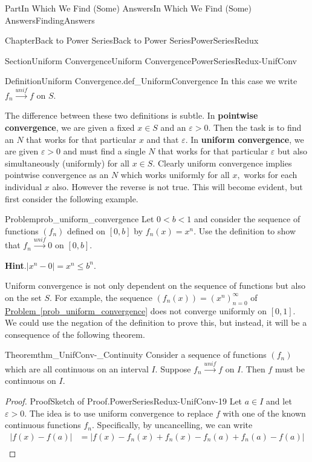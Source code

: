 \documentclass[oneside,10pt,]{book}
\newcommand{\blocktitlefont}{\relax}
\newcommand{\xreffont}{\relax}
\newcommand{\terminology}[1]{\textbf{#1}}
\numberwithin{equation}{part}
\newcommand{\eps}{\varepsilon}
\newcommand{\unif}{\stackrel{unif}{\longrightarrow}}
\newcommand{\lt}{<}
\newcommand{\amp}{&}
\begin{document}
\begin{partptx}{Part}{In Which We Find (Some) Answers}{}{In Which We Find (Some) Answers}{}{}{FindingAnswers}
\begin{chapterptx}{Chapter}{Back to Power Series}{}{Back to Power Series}{}{}{PowerSeriesRedux}
\begin{sectionptx}{Section}{Uniform Convergence}{}{Uniform Convergence}{}{}{PowerSeriesRedux-UnifConv}
\begin{definition}{Definition}{Uniform Convergence.}{def_UniformConvergence}
In this case we write \(f_n\unif f\) on \(S\).%
\end{definition}
The difference between these two definitions is subtle.  In \terminology{pointwise convergence}, we are given a fixed \(x\in S\) and an \(\eps>0\).  Then the task is to find an \(N\) that works for that particular \(x\) and that \(\eps\).  In \terminology{uniform convergence}, we are given \(\eps>0\) and must find a single \(N\) that works for that particular \(\eps\) but also simultaneously (uniformly) for all \(x\in S\).  Clearly uniform convergence implies pointwise convergence as an \(N\) which works uniformly for all \(x,\) works for each individual \(x\) also.  However the reverse is not true. This will become evident, but first consider the following example.%
\begin{problem}{Problem}{}{prob_uniform_convergence}%
Let \(0\lt b\lt 1\) and consider the sequence of functions \(\left(f_n\right)\) defined on \([0,b]\) by \(f_n(x)=x^n\).  Use the definition to show that \(f_n\unif 0\) on \([0,b]\).%
\par\smallskip%
\noindent\textbf{\blocktitlefont Hint}.\hypertarget{prob_uniform_convergence-4}{}\quad{}\(|x^n-0|=x^n\leq b^n\).%
\end{problem}
Uniform convergence is not only dependent on the sequence of functions but also on the set \(S\).  For example, the sequence \(\left(f_n(x)\right)=\left(x^n\right)_{n=0}^\infty\) of \hyperref[prob_uniform_convergence]{Problem~{\xreffont\ref{prob_uniform_convergence}}} does not converge uniformly on \([0,1]\).  We could use the negation of the definition to prove this, but instead, it will be a consequence of the following theorem.%
\begin{theorem}{Theorem}{}{}{thm_UnifConv-_Continuity}%
%
%
%
Consider a sequence of functions \(\left(f_n\right)\) which are all continuous on an interval \(I\).  Suppose \(f_n\unif f\) on \(I\).  Then \(f\) must be continuous on \(I\).%
\end{theorem}
\begin{proof}{Proof}{Sketch of Proof.}{PowerSeriesRedux-UnifConv-19}
Let \(a\in I\) and let \(\eps>0\).  The idea is to use uniform convergence to replace \(f\) with one of the known continuous functions \(f_n\).  Specifically, by uncancelling, we can write%
\begin{align*}
\left|f(x)-f(a)\right|\amp =\left|f(x)-f_n(x)+f_n(x)-f_n(a)+f_n(a)-f(a)\right|\\

\end{align*}
\end{proof}
\end{sectionptx}
\end{chapterptx}
\end{partptx}
\end{document}
